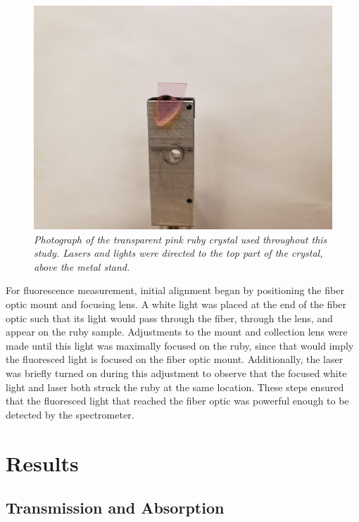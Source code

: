 \documentclass[11pt, a4paper, twocolumn]{article}
\begin{document}
\begin{figure}[]
\includegraphics[width=\linewidth]{rubyPhoto.png}
\caption{\textit{Photograph of the transparent pink ruby crystal used throughout this study. Lasers and lights were directed to the top part of the crystal, above the metal stand.}
}
\label{fig:intensities}
\end{figure}

For fluorescence measurement, initial alignment began by positioning the fiber optic mount and focusing lens. A white light was placed at the end of the fiber optic such that its light would pass through the fiber, through the lens, and appear on the ruby sample. Adjustments to the mount and collection lens were made until this light was maximally focused on the ruby, since that would imply the fluoresced light is focused on the fiber optic mount. Additionally, the laser was briefly turned on during this adjustment to observe that the focused white light and laser both struck the ruby at the same location. These steps ensured that the fluoresced light that reached the fiber optic was powerful enough to be detected by the spectrometer.

\section*{Results}
\subsection*{Transmission and Absorption}
\end{document}
